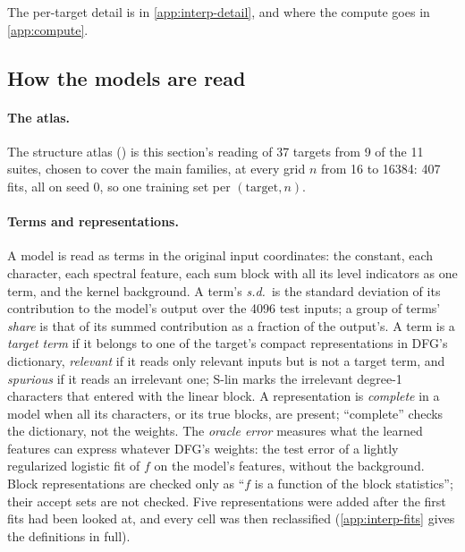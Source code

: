 The per-target detail is in \cref{app:interp-detail}, and where the compute goes in \cref{app:compute}.

\subsection{How the models are read}\label{sec:interp-how}

\paragraph{The atlas.} The structure atlas () is this section's reading of 37 targets from 9 of the 11 suites, chosen to cover the main families, at every grid $n$ from 16 to 16384: 407 fits, all on seed 0, so one training set per $(\text{target},n)$.

\paragraph{Terms and representations.} A model is read as terms in the original input coordinates: the constant, each character, each spectral feature, each sum block with all its level indicators as one term, and the kernel background. A term's \emph{s.d.}\ is the standard deviation of its contribution to the model's output over the 4096 test inputs; a group of terms' \emph{share} is that of its summed contribution as a fraction of the output's. A term is a \emph{target term} if it belongs to one of the target's compact representations in DFG's dictionary, \emph{relevant} if it reads only relevant inputs but is not a target term, and \emph{spurious} if it reads an irrelevant one; S-lin marks the irrelevant degree-1 characters that entered with the linear block. A representation is \emph{complete} in a model when all its characters, or its true blocks, are present; ``complete'' checks the dictionary, not the weights. The \emph{oracle error} measures what the learned features can express whatever DFG's weights: the test error of a lightly regularized logistic fit of $f$ on the model's features, without the background. Block representations are checked only as ``$f$ is a function of the block statistics''; their accept sets are not checked. Five representations were added after the first fits had been looked at, and every cell was then reclassified (\cref{app:interp-fits} gives the definitions in full).

